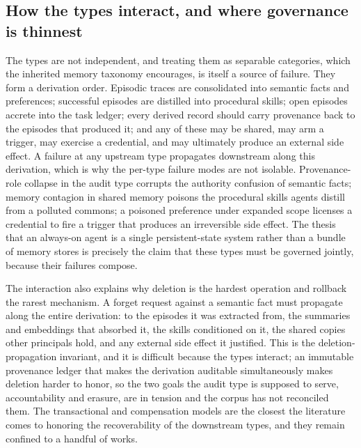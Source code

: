 \subsection{How the types interact, and where governance is thinnest}

The types are not independent, and treating them as separable categories, which the inherited memory taxonomy encourages, is itself a source of failure. They form a derivation order. Episodic traces are consolidated into semantic facts and preferences; successful episodes are distilled into procedural skills; open episodes accrete into the task ledger; every derived record should carry provenance back to the episodes that produced it; and any of these may be shared, may arm a trigger, may exercise a credential, and may ultimately produce an external side effect. A failure at any upstream type propagates downstream along this derivation, which is why the per-type failure modes are not isolable. Provenance-role collapse in the audit type \citep{jin2026provenancerolecollapse} corrupts the authority confusion of semantic facts; memory contagion in shared memory \citep{liu2026memorycontagion} poisons the procedural skills agents distill from a polluted commons; a poisoned preference under expanded scope \citep{xu2026toxicchats} licenses a credential to fire a trigger that produces an irreversible side effect. The thesis that an always-on agent is a single persistent-state system rather than a bundle of memory stores is precisely the claim that these types must be governed jointly, because their failures compose.

The interaction also explains why deletion is the hardest operation and rollback the rarest mechanism. A forget request against a semantic fact must propagate along the entire derivation: to the episodes it was extracted from, the summaries and embeddings that absorbed it, the skills conditioned on it, the shared copies other principals hold, and any external side effect it justified. This is the deletion-propagation invariant, and it is difficult because the types interact; an immutable provenance ledger that makes the derivation auditable \citep{wright2025immutablemem,ouyang2026memlineage} simultaneously makes deletion harder to honor, so the two goals the audit type is supposed to serve, accountability and erasure, are in tension and the corpus has not reconciled them. The transactional and compensation models \citep{chang2025sagallm,zheng2026acrfence} are the closest the literature comes to honoring the recoverability of the downstream types, and they remain confined to a handful of works.

